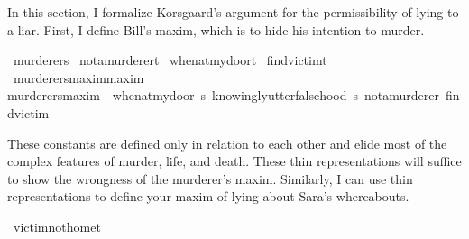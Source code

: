 \begin{isabellebody}
\begin{isamarkuptext}
In this section, I formalize Korsgaard's argument for the permissibility of lying to a liar. First, I define
Bill's maxim, which is to hide his intention to murder.%
\end{isamarkuptext}\isamarkuptrue%
\isamarkupfalse%
\ murderer{\isacharcolon}{\isacharcolon}s\isanewline
%
\isanewline
{}\isamarkupfalse%
\ not{\isacharunderscore}a{\isacharunderscore}murderer{\isacharcolon}{\isacharcolon}t\isanewline
%
\isanewline
{}\isamarkupfalse%
\ when{\isacharunderscore}at{\isacharunderscore}my{\isacharunderscore}door{\isacharcolon}{\isacharcolon}t\isanewline
%
\isanewline
{}\isamarkupfalse%
\ find{\isacharunderscore}victim{\isacharcolon}{\isacharcolon}t\isanewline
%
\isanewline
{}\isamarkupfalse%
\ murderers{\isacharunderscore}maxim{\isacharcolon}{\isacharcolon}{\isachardoublequoteopen}maxim{\isachardoublequoteclose}\ \ \isanewline
{\isachardoublequoteopen}murderers{\isacharunderscore}maxim\ {\isasymequiv}\ {\isacharparenleft}when{\isacharunderscore}at{\isacharunderscore}my{\isacharunderscore}door{\isacharcomma}\ {\isasymlambda}s{\isachardot}\ knowingly{\isacharunderscore}utter{\isacharunderscore}falsehood\ s\ not{\isacharunderscore}a{\isacharunderscore}murderer{\isacharcomma}\ find{\isacharunderscore}victim{\isacharparenright}{\isachardoublequoteclose}\isanewline
%
%
\begin{isamarkuptext}%
These constants are defined only in relation to each other and elide most of the complex features
of murder, life, and death. These thin representations will suffice to show
the wrongness of the murderer's maxim. Similarly, I can use thin representations to define your
maxim of lying about Sara's whereabouts.%
\end{isamarkuptext}\isamarkuptrue%
\isamarkupfalse%
\ victim{\isacharunderscore}not{\isacharunderscore}home{\isacharcolon}{\isacharcolon}t\isanewline

\end{isabellebody}
